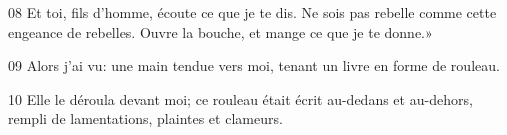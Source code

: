 
08 Et toi, fils d’homme, écoute ce que je te dis. Ne sois pas rebelle comme cette engeance de rebelles. Ouvre la bouche, et mange ce que je te donne.»

09 Alors j’ai vu: une main tendue vers moi, tenant un livre en forme de rouleau.

10 Elle le déroula devant moi; ce rouleau était écrit au-dedans et au-dehors, rempli de lamentations, plaintes et clameurs.

